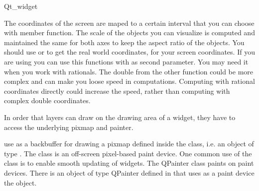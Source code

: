 \begin{ccRefClass}{Qt_widget}
\begin{ccAdvanced}
The coordinates of the screen are maped to a certain interval that you 
can choose  with  member function. The scale of the
objects you can visualize is computed and maintained the same for both 
axes to keep the aspect ratio of the objects. You should use
 or  to get the real world coordinates, for
your screen coordinates. If you are using
 you can use this functions with  as second
parameter. You may need it when you work with rationals. The double
from the other function could be more complex and can make you loose
speed in computations. Computing with rational coordinates directly
could increase the speed, rather than computing with complex double
coordinates.

\ccGlue
{}
\ccGlue
{}
\end{ccAdvanced}


\begin{ccAdvanced}

In order that layers can draw on the drawing area of a widget, they
have to access the underlying pixmap and painter.
 
 use as a backbuffer for drawing a pixmap
defined inside the class, i.e. an object of type . The
 class is an off-screen pixel-based paint device. One
common use of the  class is to enable smooth updating of widgets.
The QPainter class paints on paint devices. There is an object of type 
QPainter defined in  that uses as a paint device
the  object.


\end{ccAdvanced}
\end{ccRefClass}
